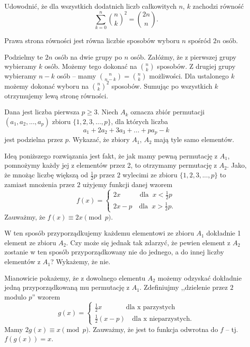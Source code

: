 \newpage

\begin{problem}{3} 
	Udowodnić, że dla wszystkich dodatnich liczb całkowitych $n$, $k$ zachodzi równość
	\[
	    \sum^{n}_{k=0} {{n}\choose{k}}^2 = {{2n}\choose{n}}.
	\]
\end{problem}

\vspace{5px}

\noindent
Prawa strona równości jest równa liczbie sposobów wyboru $n$ spośród $2n$ osób.

Podzielmy te $2n$ osób na dwie grupy po $n$ osób. Załóżmy, że z pierwszej grupy wybieramy $k$ osób. Możemy tego dokonać na ${n}\choose{k}$ sposobów. Z drugiej grupy wybieramy $n - k$ osób -- mamy ${{n}\choose{n - k}} = {{n}\choose{k}}$ możliwości. Dla ustalonego $k$ możemy dokonać wyboru na ${{n}\choose{k}}^2$ sposobów. Sumując po wszystkich $k$ otrzymujemy lewą stronę równości.

\begin{problem}{4}
	Dana jest liczba pierwsza $p \geqslant 3$. Niech $A_k$ oznacza zbiór permutacji $(a_1, a_2, ..., a_p)$ zbioru $\{1, 2, 3,..., p\}$, dla których liczba
	\[
		a_1 + 2a_2 + 3a_3 + ... + pa_p - k
	\]
	jest podzielna przez $p$. Wykazać, że zbiory $A_1$, $A_2$ mają tyle samo elementów.
\end{problem}

\vspace{5px}

\noindent
Ideą poniższego rozwiązania jest fakt, że jak mamy pewną permutację z $A_1$, pomnożymy każdy jej z elementów przez 2, to otrzymamy permutację z $A_2$. Jako, że mnożąc liczbę większą od $\frac{1}{2}p$ przez $2$ wylecimi ze zbioru $\{1, 2, 3,..., p\}$ to zamiast mnożenia przez $2$ użyjemy funkcji danej wzorem
\[
	f(x) = 
	\begin{cases}
	2x \;\;\; \quad\quad\text{dla} \;\; x < \frac{1}{2}p\\
	2x - p \quad \text{dla} \;\; x > \frac{1}{2}p.
	\end{cases}
\]
Zauważmy, że $f(x) \equiv 2x \pmod{p}$.

W ten sposób przyporządkujemy każdemu elementowi ze zbioru $A_1$ dokładnie 1 element ze zbioru $A_2$. Czy może się jednak tak zdarzyć, że pewien element z $A_2$ zostanie w ten sposób przyporządkowany nie do jednego, a do innej liczby elementów z $A_1$? Wykażemy, że nie.

Mianowicie pokażemy, że z dowolnego elementu $A_2$ możemy odzyskać dokładnie jedną przyporządkowaną mu permutację z $A_1$. Zdefiniujmy ,,dzielenie przez $2$ modulo $p$'' wzorem
\[
	g(x) = 
	\begin{cases}
	\frac{1}{2}x \;\; \quad\quad\quad\text{dla x parzystych}\\
	\frac{1}{2}(x - p) \quad \text{dla x nieparzystych}.
	\end{cases}
\]
Mamy $2g(x) \equiv x \pmod{p}$.
Zauważmy, że jest to funkcja odwrotna do $f$ -- tj. $f(g(x)) = x$.

